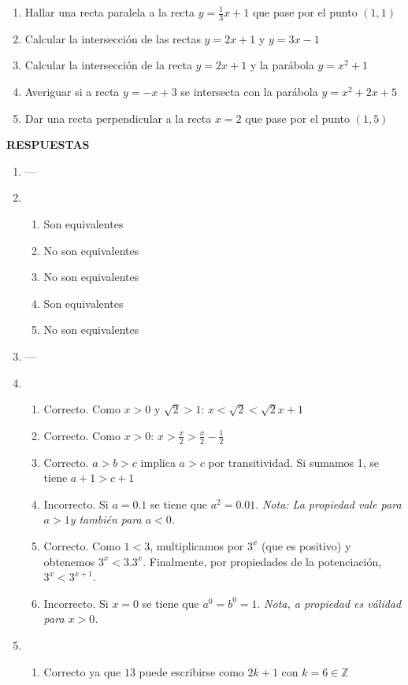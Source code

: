 \documentclass[a4paper]{article}
\newcommand{\exercise}{\item}
\begin{document}
\begin{enumerate}
\begin{enumerate} [label=(\alph*)]
		\item Hallar una recta paralela a la recta $y=\frac{1}{3}x+1$ que pase por el punto $(1,1)$
		\item Calcular la intersección de las rectas $y=2x+1$ y $y=3x-1$
		\item Calcular la intersección de la recta $y=2x+1$ y la parábola $y=x^2+1$
		\item Averiguar si a recta $y=-x+3$ se intersecta con la parábola $y=x^2+2x+5$
		\item Dar una recta perpendicular a la recta $x=2$ que pase por el punto $(1,5)$
	\end{enumerate}
\end{enumerate}
\vspace{20pt} 
 \textbf{RESPUESTAS}\begin{enumerate}\exercise---\exercise\begin{enumerate} [label=(\alph*)]		\item Son equivalentes
		\item No son equivalentes
		\item No son equivalentes
		\item Son equivalentes
		\item No son equivalentes
\end{enumerate}\exercise---\exercise\begin{enumerate} [label=(\alph*)]		\item Correcto. Como $x>0$ y $\sqrt{2}>1$: $x < \sqrt{2} < \sqrt{2} x +1$
		\item Correcto. Como $x>0$: $x > \displaystyle\frac{x}{2} > \displaystyle\frac{x}{2}-\displaystyle\frac{1}{2}$ 
		\item	Correcto. $a>b>c$ implica $a>c$ por transitividad. Si sumamos 1, se tiene $a+1>c+1$
		\item Incorrecto. Si $a=0.1$ se tiene que $a^2=0.01$. \textit{Nota: La propiedad vale para $a>1$y también para $a<0$.}
		\item Correcto. Como $1 < 3$, multiplicamos por $3^{x}$ (que es positivo) y obtenemos $3^{x} < 3.3^{x}$. Finalmente, por propiedades de la potenciación, $3^{x} < 3^{x+1}$.
		\item Incorrecto. Si $x=0$ se tiene que $a^0=b^0=1$. \textit{Nota, a propiedad es válidad para $x>0$.}
\end{enumerate}\exercise\begin{enumerate} [label=(\alph*)]		\item Correcto ya que $13$ puede escribirse como $2k+1$ con $k=6 \in \mathbb{Z}$

\end{enumerate}
\end{enumerate}
\end{document}
